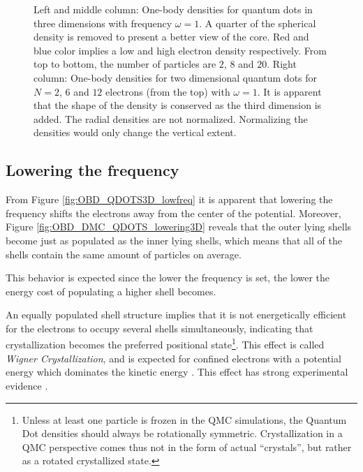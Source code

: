 \begin{figure}
\begin{center}
\begin{tabular}{cc|c}
  \end{tabular}
  \caption{Left and middle column: One-body densities for quantum dots in three dimensions with frequency $\omega=1$. A quarter of the spherical density is removed to present a better view of the core.  Red and blue color implies a low and high electron density respectively. From top to bottom, the number of particles are $2$, $8$ and $20$. Right column: One-body densities for two dimensional quantum dots for $N=2$, $6$ and $12$ electrons (from the top) with $\omega=1$. It is apparent that the  shape of the density is conserved as the third dimension is added. The radial densities are not normalized. Normalizing the densities would only change the vertical extent.}
  \label{fig:OBD_QDOTS3D_highfreq}
 \end{center}
\end{figure}

\captionsetup[subfloat]{labelformat=parens}

\clearpage

\subsection{Lowering the frequency}


From Figure \ref{fig:OBD_QDOTS3D_lowfreq} it is apparent that lowering the frequency shifts the electrons away from the center of the potential. Moreover, Figure \ref{fig:OBD_DMC_QDOTS_lowering3D} reveals that the outer lying shells become just as populated as the inner lying shells, which means that all of the shells contain the same amount of particles on average.

This behavior is expected since the lower the frequency is set, the lower the energy cost of populating a higher shell becomes. 

An equally populated shell structure implies that it is not energetically efficient for the electrons to occupy several shells simultaneously, indicating that crystallization becomes the preferred positional state\footnote{Unless at least one particle is frozen in the QMC simulations, the Quantum Dot densities should always be rotationally symmetric. Crystallization in a QMC perspective comes thus not in the form of actual ``crystals'', but rather as a rotated crystallized state.}. This effect is called \textit{Wigner Crystallization}, and is expected for confined electrons with a potential energy which dominates the kinetic energy \cite{WignerMolecule}. This effect has strong experimental evidence \cite{WignerCrystal, WignerCrystal2}. 

